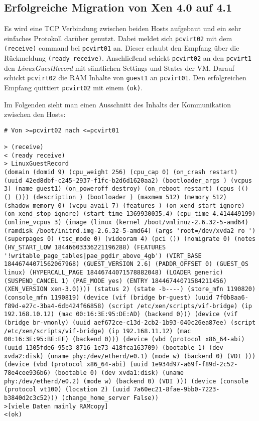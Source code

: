\subsection{Erfolgreiche Migration von Xen 4.0 auf 4.1}
Es wird eine TCP Verbindung zwischen beiden Hosts aufgebaut und ein sehr einfaches Protokoll darüber genutzt. Dabei meldet sich \verb#pcvirt02# mit dem \verb|(receive)| command bei \verb#pcvirt01# an. Dieser erlaubt den Empfang über die Rückmeldung \verb|(ready receive)|. Anschließend schickt \verb#pcvirt02# an den \verb#pcvirt1# den \emph{LinuxGuestRecord} mit sämtlichen Settings und States der VM. Darauf schickt \verb#pcvirt02# die RAM Inhalte von \verb#guest1# an \verb#pcvirt01#. Den erfolgreichen Empfang quittiert \verb#pcvirt02# mit einem \verb|(ok)|.

Im Folgenden sieht man einen Ausschnitt des Inhalts der Kommunikation zwischen den Hosts:
\setupVerbatimOut
\begin{verbatim}
# Von >=pcvirt02 nach <=pcvirt01

> (receive)
< (ready receive)
> LinuxGuestRecord
(domain (domid 9) (cpu_weight 256) (cpu_cap 0) (on_crash restart) (uuid 42ed8dbf-c245-2937-f1fc-b2d6d1620aa2) (bootloader_args ) (vcpus 3) (name guest1) (on_poweroff destroy) (on_reboot restart) (cpus (() () ())) (description ) (bootloader ) (maxmem 512) (memory 512) (shadow_memory 0) (vcpu_avail 7) (features ) (on_xend_start ignore) (on_xend_stop ignore) (start_time 1369930035.4) (cpu_time 4.414449199) (online_vcpus 3) (image (linux (kernel /boot/vmlinuz-2.6.32-5-amd64) (ramdisk /boot/initrd.img-2.6.32-5-amd64) (args 'root=/dev/xvda2 ro ') (superpages 0) (tsc_mode 0) (videoram 4) (pci ()) (nomigrate 0) (notes (HV_START_LOW 18446603336221196288) (FEATURES '!writable_page_tables|pae_pgdir_above_4gb') (VIRT_BASE 18446744071562067968) (GUEST_VERSION 2.6) (PADDR_OFFSET 0) (GUEST_OS linux) (HYPERCALL_PAGE 18446744071578882048) (LOADER generic) (SUSPEND_CANCEL 1) (PAE_MODE yes) (ENTRY 18446744071584211456) (XEN_VERSION xen-3.0)))) (status 2) (state -b----) (store_mfn 1190820) (console_mfn 1190819) (device (vif (bridge br-guest) (uuid 7f0b8aa6-f89d-e27c-3ba4-6db424f66858) (script /etc/xen/scripts/vif-bridge) (ip 192.168.10.12) (mac 00:16:3E:95:DE:AD) (backend 0))) (device (vif (bridge br-vmonly) (uuid aef672ce-c13d-2cb2-1b93-040c26ea87ee) (script /etc/xen/scripts/vif-bridge) (ip 192.168.11.12) (mac 00:16:3E:95:BE:EF) (backend 0))) (device (vbd (protocol x86_64-abi) (uuid 1305fde6-95c3-8716-1e73-418fca163709) (bootable 1) (dev xvda2:disk) (uname phy:/dev/etherd/e0.1) (mode w) (backend 0) (VDI ))) (device (vbd (protocol x86_64-abi) (uuid 1e934d97-a69f-f89d-2c52-78e4cee936b6) (bootable 0) (dev xvda1:disk) (uname phy:/dev/etherd/e0.2) (mode w) (backend 0) (VDI ))) (device (console (protocol vt100) (location 2) (uuid 7a60ec21-8fae-9bb0-7223-b3840d2c3c52))) (change_home_server False))
>[viele Daten mainly RAMcopy]
<(ok)
\end{verbatim}

